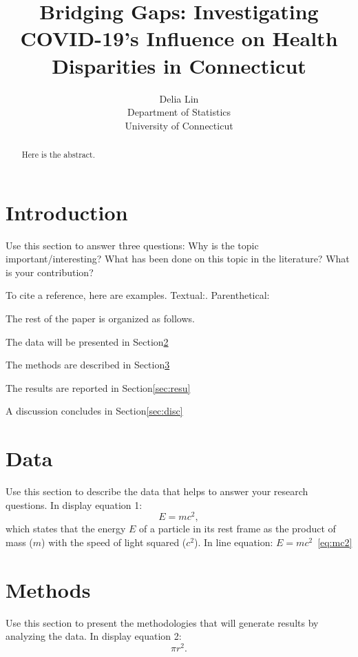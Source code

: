 \documentclass[12pt]{article}
\title{Bridging Gaps: Investigating COVID-19's Influence on Health Disparities in Connecticut}
\author{Delia Lin\\
  Department of Statistics\\
  University of Connecticut
}
\begin{document}
\maketitle


\begin{abstract}
Here is the abstract.  
\end{abstract}


\section{Introduction}\label{sec:intro}

Use this section to answer three questions:
Why is the topic important/interesting?
What has been done on this topic in the literature?
What is your contribution?

\lipsum[1]

To cite a reference, here are examples. Textual:\citet{dwivedi2017analysis}. Parenthetical:\citep{xie2015dynamic}
\lipsum[2]

The rest of the paper is organized as follows.

The data will be presented in Section\ref{sec:data}

The methods are described in Section\ref{sec:meth}

The results are reported in Section\ref{sec:resu}

A discussion concludes in Section\ref{sec:disc}


\section{Data}\label{sec:data}

Use this section to describe the data that helps to answer your research
questions. In display equation 1:
\begin{equation}\label{eq:mc2} 
  E = m c^2,
\end{equation}
which states that the energy $E$ of a particle in its rest frame as the product
of mass ($m$) with the speed of light squared ($c^2$). In line equation: $E=m c^2$~\ref{eq:mc2}

\section{Methods}\label{sec:meth}

Use this section to present the methodologies that will generate results by
analyzing the data. In display equation 2: 
\begin{equation}
  \label{eq:area}
  \pi r^2.
\end{equation}
\end{document}

